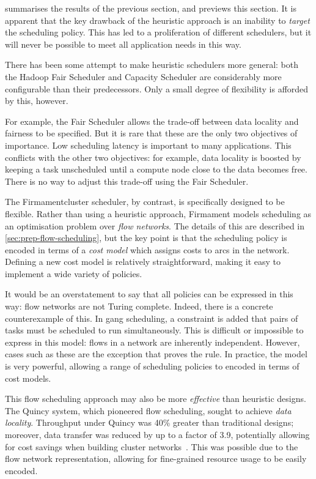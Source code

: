  summarises the results of the previous section, and previews this section. It is apparent that the key drawback of the heuristic approach is an inability to \emph{target} the scheduling policy. This has led to a proliferation of different schedulers, but it will never be possible to meet all application needs in this way.

There has been some attempt to make heuristic schedulers more general: both the Hadoop Fair Scheduler and Capacity Scheduler are considerably more configurable than their predecessors. Only a small degree of flexibility is afforded by this, however. 

For example, the Fair Scheduler allows the trade-off between data locality and fairness to be specified. But it is rare that these are the only two objectives of importance. Low scheduling latency is important to many applications. This conflicts with the other two objectives: for example, data locality is boosted by keeping a task unscheduled until a compute node close to the data becomes free. There is no way to adjust this trade-off using the Fair Scheduler.

The Firmament\footnotemark cluster scheduler, by contrast, is specifically designed to be flexible. Rather than using a heuristic approach, Firmament models scheduling as an optimisation problem over \emph{flow networks}. The details of this are described in \cref{sec:prep-flow-scheduling}, but the key point is that the scheduling policy is encoded in terms of a \emph{cost model} which assigns costs to arcs in the network. Defining a new cost model is relatively straightforward, making it easy to implement a wide variety of policies.

It would be an overstatement to say that all policies can be expressed in this way: flow networks are not Turing complete. Indeed, there is a concrete counterexample of this. In gang scheduling, a constraint is added that pairs of tasks must be scheduled to run simultaneously. This is difficult or impossible to express in this model: flows in a network are inherently independent. However, cases such as these are the exception that proves the rule. In practice, the model is very powerful, allowing a range of scheduling policies to encoded in terms of cost models. 

This flow scheduling approach may also be more \emph{effective} than heuristic designs. The Quincy system, which pioneered flow scheduling, sought to achieve \emph{data locality}. Throughput under Quincy was 40\% greater than traditional designs; moreover, data transfer was reduced by up to a factor of 3.9, potentially allowing for cost savings when building cluster networks~\cite{Isard:2009}. This was possible due to the flow network representation, allowing for fine-grained resource usage to be easily encoded. 

